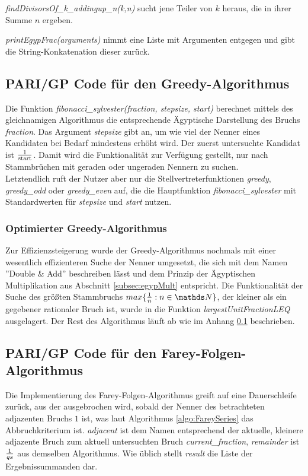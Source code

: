 \emph{findDivisorsOf\_k\_addingup\_n(k,n)} sucht jene Teiler von $k$ heraus, die in ihrer Summe $n$ ergeben.


\emph{printEgypFrac(arguments)} nimmt eine Liste mit Argumenten entgegen und gibt die String-Konkatenation dieser zurück.



\subsection{PARI/GP Code für den Greedy-Algorithmus}\label{code:greedy}
Die Funktion \emph{fibonacci\_sylvester(fraction, stepsize, start)} berechnet mittels des gleichnamigen Algorithmus die entsprechende Ägyptische Darstellung des Bruchs \emph{fraction}. Das Argument \emph{stepsize} gibt an, um wie viel der Nenner eines Kandidaten bei Bedarf mindestens erhöht wird. Der zuerst untersuchte Kandidat ist $\frac{1}{\text{start}}$. Damit wird die Funktionalität zur Verfügung gestellt, \bspw nur nach Stammbrüchen mit geraden oder ungeraden Nennern zu suchen.\\
Letztendlich ruft der Nutzer aber nur die Stellvertreterfunktionen \emph{greedy}, \emph{greedy\_odd} oder \emph{greedy\_even} auf, die die Hauptfunktion \emph{fibonacci\_sylvester} mit Standardwerten für \emph{stepsize} und \emph{start} nutzen.



\subsubsection{Optimierter Greedy-Algorithmus}\label{code:greedy_fast}
Zur Effizienzsteigerung wurde der Greedy-Algorithmus nochmals mit einer wesentlich effizienteren Suche der Nenner umgesetzt, die sich mit dem Namen ''Double \& Add'' beschreiben lässt und dem Prinzip der Ägyptischen Multiplikation aus Abschnitt \ref{subsec:egypMult} entspricht. Die Funktionalität der Suche des größten Stammbruchs $max\{\uf{n}: n \in \N\}$, der kleiner als ein gegebener rationaler Bruch ist, wurde in die Funktion \emph{largestUnitFractionLEQ} ausgelagert. Der Rest des Algorithmus läuft ab wie im Anhang \ref{code:greedy} beschrieben.



\subsection{PARI/GP Code für den Farey-Folgen-Algorithmus}\label{code:fareyseries}
Die Implementierung des Farey-Folgen-Algorithmus greift auf eine Dauerschleife zurück, aus der ausgebrochen wird, sobald der Nenner des betrachteten adjazenten Bruchs $1$ ist, was laut Algorithmus \ref{algo:FareySeries} das Abbruchkriterium ist. \emph{adjacent} ist dem Namen entsprechend der aktuelle, kleinere adjazente Bruch zum aktuell untersuchten Bruch \emph{current\_fraction}, \emph{remainder} ist $\frac{1}{qs}$ aus demselben Algorithmus. Wie üblich stellt \emph{result} die Liste der Ergebnissummanden dar.


